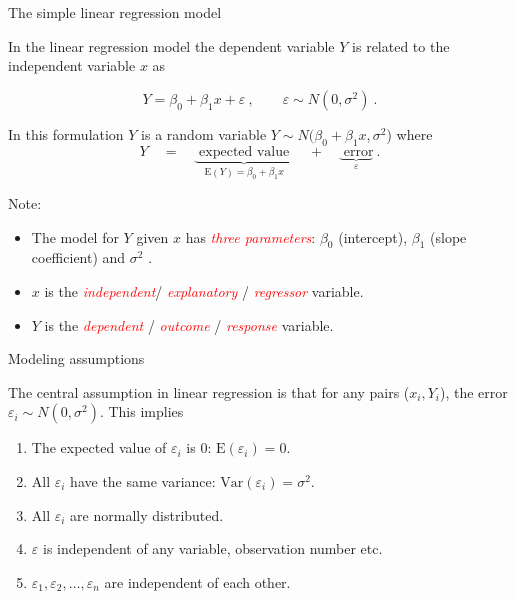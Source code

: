 \documentclass[10pt,ignorenonframetext,]{beamer}
\providecommand{\tightlist}{%
  \setlength{\itemsep}{0pt}\setlength{\parskip}{0pt}}
\begin{document}
\begin{frame}

\begin{block}{The simple linear regression model}

\vspace{3mm}

In the linear regression model the dependent variable \(Y\) is related
to the independent variable \(x\) as

\[Y = \beta_0 + \beta_1 x + \varepsilon \ , \qquad \varepsilon \sim N(0,\sigma^2) \ .\]
\vspace{2mm}

In this formulation \(Y\) is a random variable
\(Y \sim N(\beta_0 + \beta_1 x, \sigma^2\)) where
\[Y \quad= \quad \underbrace{\text{ expected value }}_{\text{E}(Y) = \beta_0 + \beta_1 x} \quad + \quad \underbrace{\text{ error}}_{\varepsilon}  \ .\]

Note:

\begin{itemize}
\tightlist
\item
  The model for \(Y\) given \(x\) has
  \emph{\textcolor{red}{three parameters}}: \(\beta_0\) (intercept),
  \(\beta_1\) (slope coefficient) and \(\sigma^2\) .
\item
  \(x\) is the \emph{\textcolor{red}{independent}}/
  \emph{\textcolor{red}{explanatory}} /
  \emph{\textcolor{red}{regressor}} variable.
\item
  \(Y\) is the \emph{\textcolor{red}{dependent}} /
  \emph{\textcolor{red}{outcome}} / \emph{\textcolor{red}{response}}
  variable.
\end{itemize}

\end{block}

\end{frame}

\begin{frame}

\begin{block}{Modeling assumptions}

\vspace{4mm} The central assumption in linear regression is that for any
pairs (\(x_i,Y_i\)), the error \(\varepsilon_i \sim N(0,\sigma^2)\).
This implies \vspace{2mm}

\begin{enumerate}
\def\labelenumi{\alph{enumi})}
\item
  The expected value of \(\varepsilon_i\) is 0:
  \(\text{E}(\varepsilon_i)=0\).
\item
  All \(\varepsilon_i\) have the same variance:
  \(\text{Var}(\varepsilon_i)=\sigma^2\).
\item
  All \(\varepsilon_i\) are normally distributed.
\item
  \(\varepsilon\) is independent of any variable, observation number
  etc.
\item
  \(\varepsilon_1, \varepsilon_2, \ldots, \varepsilon_n\) are
  independent of each other.
\end{enumerate}

\end{block}

\end{frame}
\end{document}
